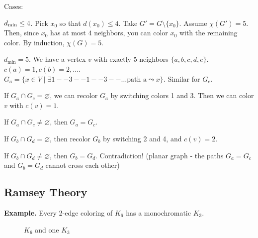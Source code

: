 Cases: \\
\begin{compactenum}
  \item $d_{\text{min}} \leq 4$. Pick $x_0$ so that $d(x_0) \leq 4$.
Take $G' = G \setminus \{x_0\}$. Assume $\chi(G')=5$. Then, since $x_0$ has at most $4$ neighbors, you can color $x_0$ with the remaining color. By induction, $\chi(G)=5$.

  \item $d_{\text{min}}=5$.
We have a vertex $v$ with exactly 5 neighbors $\{a,b,c,d,e\}$.
$c(a) = 1, c(b) = 2,\ldots$.
\\
$G_a = \{x\in V\mid \exists 1--3--1--3--\ldots \text{path a} \leadsto x\}$.
Similar for $G_c$.
  \begin{compactenum}
    \item If $G_a\cap G_c =\varnothing$, we can recolor $G_a$ by switching colors 1 and 3. Then we can color $v$ with $c(v) = 1$.

    \item If $G_a\cap G_c ≠ \varnothing$, then $G_a = G_c$.
    \begin{compactenum}
      \item If $G_b\cap G_d =\varnothing$, then recolor $G_b$ by switching 2 and 4, and $c(v) = 2$.
      \item If $G_b\cap G_d ≠\varnothing$, then $G_b = G_d$. Contradiction! (planar graph - the paths $G_a=G_c$ and $G_b=G_d$ cannot cross each other)
    \end{compactenum}
  \end{compactenum}
\end{compactenum}

\subsection*{Ramsey Theory}

\textbf{Example.} Every 2-edge coloring of $K_6$ has a monochromatic $K_3$.

\begin{figure}[htb]
  \centering
  \caption{$K_6$ and one $K_3$}
\end{figure}
\FloatBarrier

